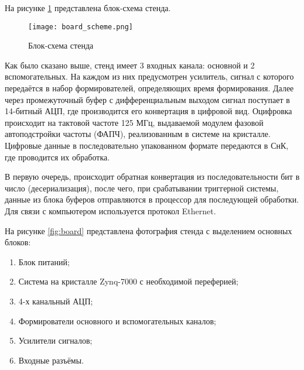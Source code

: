 На рисунке \ref{fig:board_scheme} представлена блок-схема стенда.\par
\begin{figure}[ht]
    \centering
    \texttt{[image: board\_scheme.png]}
    \caption{Блок-схема стенда}
    \label{fig:board_scheme}
\end{figure}
Как было сказано выше, стенд имеет 3 входных канала: основной и 2 вспомогательных. На каждом из них предусмотрен усилитель, сигнал с которого передаётся в набор формирователей, определяющих время формирования. Далее через промежуточный буфер с дифференциальным выходом сигнал поступает в 14-битный АЦП, где производится его конвертация в цифровой вид. Оцифровка происходит на тактовой частоте 125 МГц, выдаваемой модулем фазовой автоподстройки частоты (ФАПЧ), реализованным в системе на кристалле. Цифровые данные в последовательно упакованном формате передаются в СнК, где проводится их обработка.\par
В первую очередь, происходит обратная конвертация из последовательности бит в число (десериализация), после чего, при срабатывании триггерной системы, данные из блока буферов отправляются в процессор для последующей обработки. Для связи с компьютером используется протокол Ethernet.\par
На рисунке \ref{fig:board} представлена фотография стенда с выделением основных блоков:\par
\begin{enumerate}
    \item Блок питаний;
    \item Система на кристалле Zynq-7000 с необходимой переферией;
    \item 4-х канальный АЦП;
    \item Формирователи основного и вспомогательных каналов;
    \item Усилители сигналов;
    \item Входные разъёмы. 
\end{enumerate}

